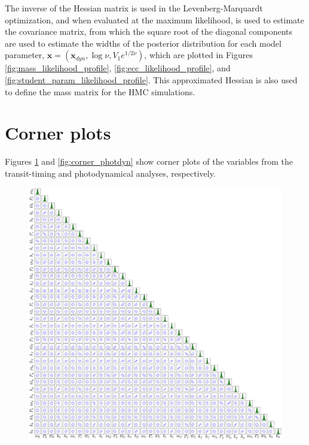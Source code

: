 \documentclass[twocolumn]{aastex63}
\begin{document}
The inverse of the Hessian matrix is used in the Levenberg-Marquardt optimization, and when evaluated at the maximum likelihood, is used to estimate the covariance matrix, from which the square root of the diagonal components are used to estimate the widths of the posterior distribution for each model parameter, $\mathbf{x} = (\mathbf{x}_{dyn},\log \nu, V_1 e^{1/2\nu})$, which are plotted in Figures \ref{fig:mass_likelihood_profile}, \ref{fig:ecc_likelihood_profile}, and \ref{fig:student_param_likelihood_profile}.  This approximated Hessian is also used to define the mass matrix for the HMC simulations.

\section{Corner plots}

Figures \ref{fig:corner_ttv} and \ref{fig:corner_photdyn} 
show corner plots of the variables
from the transit-timing and photodynamical analyses, respectively.

\begin{figure}
    \centering
    \includegraphics[width=\hsize]{figures/corner_ttv.png}
    \label{fig:corner_ttv}
\end{figure}
\end{document}
